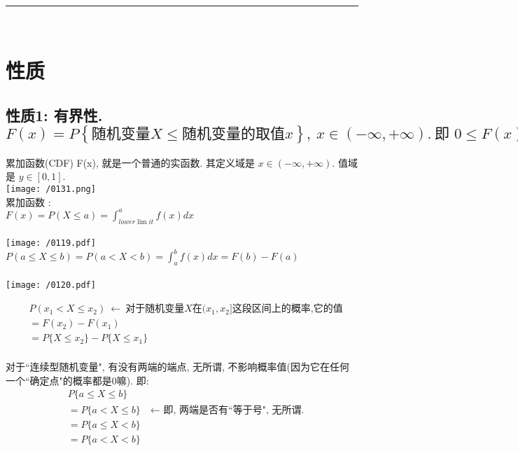 \documentclass[UTF8]{ctexart}
\begin{document}
~\\
\hrule
~\\

\section{性质}


\subsection{性质1: 有界性. $	F\left( x \right) =P\left\{ \text{随机变量}X\leq \text{随机变量的取值}x \right\} ,\ x\in \left( -\infty ,+\infty \right) .\ \text{即\ }0\leq F\left( x \right) \leq 1	$}

累加函数(CDF) F(x), 就是一个普通的实函数. 其定义域是 $x \in (-\infty, +\infty)$. 值域是 $y \in [0,1]$. \\

\texttt{[image: /0131.png]} \\



	累加函数 : \\
	$ \boxed{
	F(x)=P(X\leq a)=\int_{lower\lim it}^a{f\left( x \right) dx}	}$ \\
	\\
	\texttt{[image: /0119.pdf]} \\
	
	
	$ \boxed{
	P(a\leq X\leq b)=P(a<X<b)=\int_a^b{f\left( x \right) dx}=F\left( b \right) -F\left( a \right) 	} $ \\
\\
	\texttt{[image: /0120.pdf]} 
	
	
	\begin{align*}  %
	& P(x_1<X\leq x_2)\ ←\ \text{对于随机变量}X\text{在}(x_1,x_2]\text{这段区间上的概率,它的值}\\
& =F(x_2)-F(x_1)\\
& =P\{X\leq x_2\}-P\{X\leq x_1\}
	\end{align*} \\


对于``连续型随机变量", 有没有两端的端点, 无所谓, 不影响概率值(因为它在任何一个``确定点"的概率都是0嘛). 即: 
\begin{align*}
	& P \{ a \leq X \leq b \} \\
	& = P \{ a < X \leq b \}  \quad  \text{← 即, 两端是否有``等于号", 无所谓.} \\
	& = P \{ a \leq X < b \}  \\
	& = P \{ a < X < b \}
\end{align*} 
\end{document}
